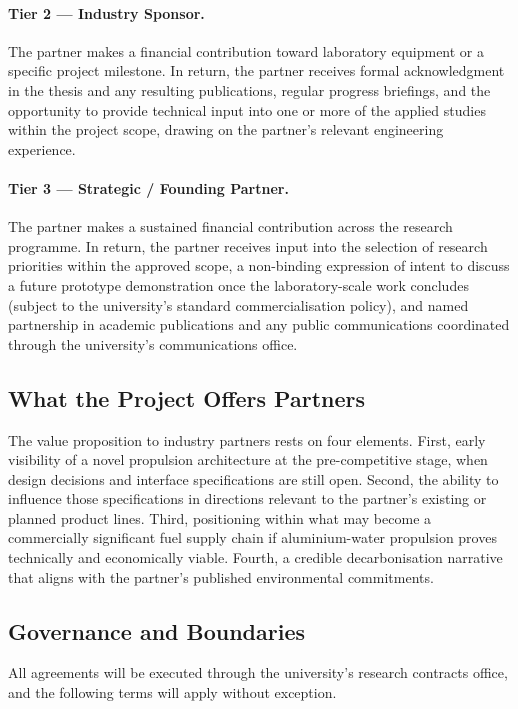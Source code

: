 \documentclass[12pt]{article}
\begin{document}
\paragraph{Tier 2 --- Industry Sponsor.}
The partner makes a financial contribution toward laboratory equipment
or a specific project milestone. In return, the partner receives
formal acknowledgment in the thesis and any resulting publications,
regular progress briefings, and the opportunity to provide technical
input into one or more of the applied studies within the project
scope, drawing on the partner's relevant engineering experience.

\paragraph{Tier 3 --- Strategic / Founding Partner.}
The partner makes a sustained financial contribution across the
research programme. In return, the partner receives input into the
selection of research priorities within the approved scope, a
non-binding expression of intent to discuss a future prototype
demonstration once the laboratory-scale work concludes (subject to the
university's standard commercialisation policy), and named partnership
in academic publications and any public communications coordinated
through the university's communications office.

\subsection{What the Project Offers Partners}

The value proposition to industry partners rests on four elements.
First, early visibility of a novel propulsion architecture at the
pre-competitive stage, when design decisions and interface
specifications are still open. Second, the ability to influence those
specifications in directions relevant to the partner's existing or
planned product lines. Third, positioning within what may become a
commercially significant fuel supply chain if aluminium-water
propulsion proves technically and economically viable. Fourth, a
credible decarbonisation narrative that aligns with the partner's
published environmental commitments.

\subsection{Governance and Boundaries}

All agreements will be executed through the university's research
contracts office, and the following terms will apply without
exception.
\end{document}
